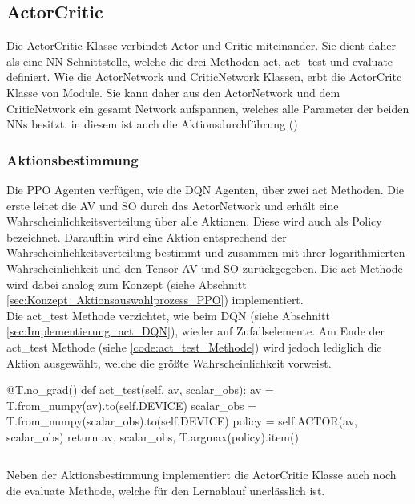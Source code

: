 \subsection{ActorCritic} \label{sec:Implementierung_ActorCritic}
Die ActorCritic Klasse verbindet Actor und Critic miteinander. Sie dient daher als eine NN Schnittstelle, welche die drei Methoden act, act\_test und  evaluate definiert.
Wie die ActorNetwork und CriticNetwork Klassen, erbt die ActorCritc Klasse von Module. Sie kann daher aus den ActorNetwork und dem CriticNetwork ein gesamt Network aufspannen, welches alle Parameter der beiden NNs besitzt. in diesem ist auch die Aktionsdurchführung ()

\subsubsection{Aktionsbestimmung} \label{sec:Implementierung_act_PPO}
Die PPO Agenten verfügen, wie die DQN Agenten, über zwei act Methoden. Die erste leitet die AV und SO durch das ActorNetwork und erhält eine Wahrscheinlichkeitsverteilung über alle Aktionen. Diese wird auch als Policy bezeichnet.
Daraufhin wird eine Aktion entsprechend der Wahrscheinlichkeitsverteilung bestimmt und zusammen mit ihrer logarithmierten Wahrscheinlichkeit und den Tensor AV und SO zurückgegeben.
Die act Methode wird dabei analog zum Konzept (siehe Abschnitt \ref{sec:Konzept_Aktionsauswahlprozess_PPO}) implementiert.\\
Die act\_test Methode verzichtet, wie beim DQN (siehe Abschnitt \ref{sec:Implementierung_act_DQN}), wieder auf Zufallselemente.
Am Ende der act\_test Methode (siehe \ref{code:act_test_Methode}) wird jedoch lediglich die Aktion ausgewählt, welche die größte Wahrscheinlichkeit vorweist.
\begin{python}
@T.no_grad()
def act_test(self, av, scalar_obs):
	av = T.from_numpy(av).to(self.DEVICE)
	scalar_obs = T.from_numpy(scalar_obs).to(self.DEVICE)
	policy = self.ACTOR(av, scalar_obs)
	return av, scalar_obs, T.argmax(policy).item()
\end{python}
\begin{lstlisting}[caption=Darstellung der act\_test Methode, label=code:act_test_Methode]
\end{lstlisting}
Neben der Aktionsbestimmung implementiert die ActorCritic Klasse auch noch die evaluate Methode, welche für den Lernablauf unerlässlich ist.

